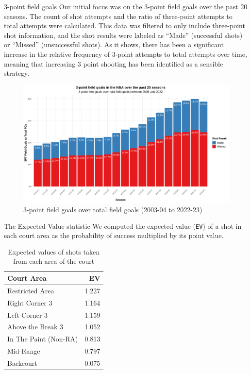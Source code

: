 \documentclass[
  ignorenonframetext,
]{beamer}
\begin{document}
\begin{frame}{3-point field goals}
\protect\hypertarget{point-field-goals}{}
Our initial focus was on the 3-point field goals over the past 20
seasons. The count of shot attempts and the ratio of three-point
attempts to total attempts were calculated. This data was filtered to
only include three-point shot information, and the shot results were
labeled as ``Made'' (successful shots) or ``Missed'' (unsuccessful
shots). As it shows, there has been a significant increase in the
relative frequency of 3-point attempts to total attempts over time,
meaning that increasing 3 point shooting has been identified as a
sensible strategy.
\end{frame}

\begin{frame}
\begin{figure}

{\centering \includegraphics[width=1\linewidth]{latex/plotspres/plot_1} 

}

\caption{3-point field goals over total field goals (2003-04 to 2022-23)}\label{fig:3ptprog}
\end{figure}
\end{frame}

\begin{frame}[fragile]{The Expected Value statistic}
\protect\hypertarget{the-expected-value-statistic}{}
We computed the expected value (\texttt{EV}) of a shot in each court
area as the probability of success multiplied by its point value.

\begin{table}[H]

\caption{\label{tab:evinfo}Expected values of shots
                 taken from each area of the court}
\centering
\begin{tabular}[t]{l|r}
\hline
Court Area & EV\\
\hline
Restricted Area & 1.227\\
Right Corner 3 & 1.164\\
Left Corner 3 & 1.159\\
Above the Break 3 & 1.052\\
In The Paint (Non-RA) & 0.813\\
Mid-Range & 0.797\\
Backcourt & 0.075\\
\hline
\end{tabular}
\end{table}
\end{frame}
\end{document}
